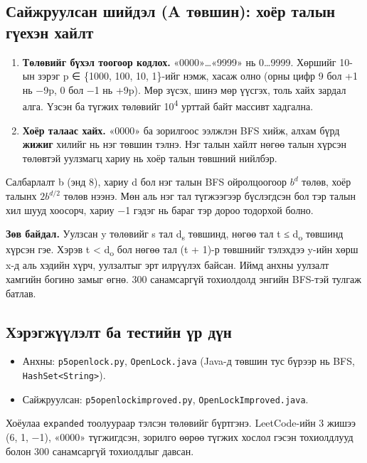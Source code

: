 \documentclass[11pt,a4paper]{article}
\renewcommand{\_}{\oldunderscore\allowbreak}
\begin{document}
\subsection{Сайжруулсан шийдэл (A төвшин): хоёр талын гүехэн хайлт}
\begin{enumerate}
\item \textbf{Төлөвийг бүхэл тоогоор кодлох.} «0000»…«9999» нь 0…9999. Хөршийг 10-ын зэрэг p ∈ \{1000, 100, 10, 1\}-ийг нэмж, хасаж олно (орны цифр 9 бол +1 нь −9p, 0 бол −1 нь +9p). Мөр зүсэх, шинэ мөр үүсгэх, толь хайх зардал алга. Үзсэн ба түгжих төлөвийг 10\textsuperscript{4} урттай байт массивт хадгална.
\item \textbf{Хоёр талаас хайх.} «0000» ба зорилгоос ээлжлэн BFS хийж, алхам бүрд \textbf{жижиг} хилийг нь нэг төвшин тэлнэ. Нэг талын хайлт нөгөө талын хүрсэн төлөвтэй уулзмагц хариу нь хоёр талын төвшний нийлбэр.
\end{enumerate}
Салбарлалт b (энд 8), хариу d бол нэг талын BFS ойролцоогоор $b^d$ төлөв, хоёр талынх $2b^{d/2}$ төлөв нээнэ. Мөн аль нэг тал түгжээгээр бүслэгдсэн бол тэр талын хил шууд хоосорч, хариу −1 гэдэг нь бараг тэр дороо тодорхой болно.

\textbf{Зөв байдал.} Уулзсан y төлөвийг s тал d\textsubscript{s} төвшинд, нөгөө тал t ≤ d\textsubscript{o} төвшинд хүрсэн гэе. Хэрэв t < d\textsubscript{o} бол нөгөө тал (t + 1)-р төвшнийг тэлэхдээ y-ийн хөрш x-д аль хэдийн хүрч, уулзалтыг эрт илрүүлэх байсан. Иймд анхны уулзалт хамгийн богино замыг өгнө. 300 санамсаргүй тохиолдолд энгийн BFS-тэй тулгаж батлав.

\subsection{Хэрэгжүүлэлт ба тестийн үр дүн}
\begin{itemize}
\item Анхны: \texttt{p5\_open\_lock.py}, \texttt{OpenLock.java} (Java-д төвшин тус бүрээр нь BFS, \texttt{HashSet<String>}).
\item Сайжруулсан: \texttt{p5\_open\_lock\_improved.py}, \texttt{OpenLockImproved.java}.
\end{itemize}
Хоёулаа \texttt{expanded} тоолуураар тэлсэн төлөвийг бүртгэнэ. LeetCode-ийн 3 жишээ (6, 1, −1), «0000» түгжигдсэн, зорилго өөрөө түгжих хослол гэсэн тохиолдлууд болон 300 санамсаргүй тохиолдлыг давсан.
\end{document}
